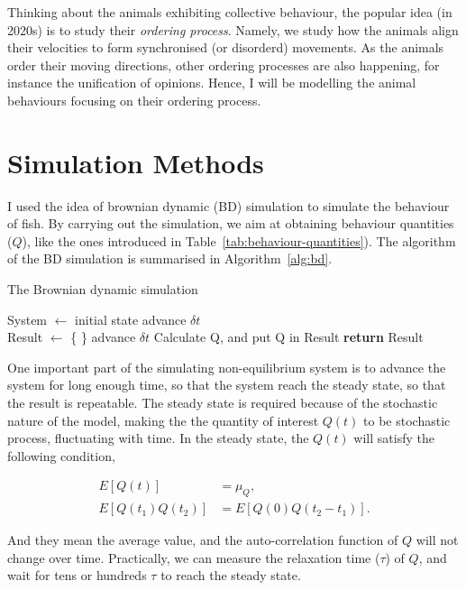 \documentclass[11pt,twoside]{report}
\begin{document}
Thinking about the animals exhibiting collective behaviour, the popular idea (in 2020s) is to study their \emph{ordering process}. Namely, we study how the animals align their velocities to form synchronised (or disorderd) movements. As the animals order their moving directions, other ordering processes are also happening, for instance the unification of opinions. Hence, I will be modelling the animal behaviours focusing on their ordering process.


\section{Simulation Methods}

I used the idea of brownian dynamic (BD) simulation to simulate the behaviour of fish. By carrying out the simulation, we aim at obtaining behaviour quantities ($Q$), like the ones introduced in Table~\ref{tab:behaviour-quantities}). The algorithm of the BD simulation is summarised in Algorithm~\ref{alg:bd}.


\begin{algorithm}
\caption{The Brownian dynamic simulation}
\label{alg:bd}
\begin{algorithmic}
	\State System $\gets$ initial state
	\Repeat
		\State advance $\delta t$
	 \\
	
	\State Result $\gets$ \{ \}
	\Repeat
		\State advance $\delta t$
		\State Calculate Q, and put Q in Result
	\State \textbf{return} Result
\end{algorithmic}
\end{algorithm}

\noindent One important part of the simulating non-equilibrium system is to advance the system for long enough time, so that the system reach the steady state, so that the result is repeatable. The steady state is required because of the stochastic nature of the model, making the the quantity of interest $Q(t)$ to be stochastic process, fluctuating with time. In the steady state, the $Q(t)$ will satisfy the following condition,

$$
\begin{aligned}
	E[Q(t)] &= \mu_Q, \\
	E[ Q(t_1) Q(t_2) ] &= E[ Q(0) Q(t_2 - t_1) ].
\end{aligned}
$$

\noindent And they mean the average value, and the auto-correlation function of $Q$ will not change over time. Practically, we can measure the relaxation time ($\tau$) of $Q$, and wait for tens or hundreds $\tau$ to reach the steady state.
\end{document}
